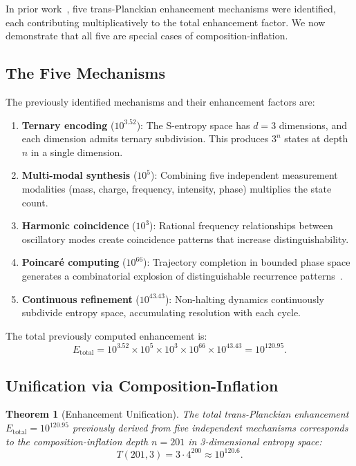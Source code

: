 \documentclass[twocolumn,10pt,a4paper]{article}
\newtheorem{theorem}{Theorem}[section]
\theoremstyle{definition}
\theoremstyle{remark}
\begin{document}
In prior work~\cite{sachikonye2025trans}, five trans-Planckian enhancement mechanisms were identified, each contributing multiplicatively to the total enhancement factor. We now demonstrate that all five are special cases of composition-inflation.

\subsection{The Five Mechanisms}

The previously identified mechanisms and their enhancement factors are:

\begin{enumerate}[label=\textbf{M\arabic*}:]
\item \textbf{Ternary encoding} ($10^{3.52}$): The S-entropy space has $d = 3$ dimensions, and each dimension admits ternary subdivision. This produces $3^n$ states at depth $n$ in a single dimension.
\item \textbf{Multi-modal synthesis} ($10^{5}$): Combining five independent measurement modalities (mass, charge, frequency, intensity, phase) multiplies the state count.
\item \textbf{Harmonic coincidence} ($10^{3}$): Rational frequency relationships between oscillatory modes create coincidence patterns that increase distinguishability.
\item \textbf{Poincar\'{e} computing} ($10^{66}$): Trajectory completion in bounded phase space generates a combinatorial explosion of distinguishable recurrence patterns~\cite{poincare1890}.
\item \textbf{Continuous refinement} ($10^{43.43}$): Non-halting dynamics continuously subdivide entropy space, accumulating resolution with each cycle.
\end{enumerate}

The total previously computed enhancement is:
\begin{equation}
E_{\mathrm{total}} = 10^{3.52} \times 10^{5} \times 10^{3} \times 10^{66} \times 10^{43.43} = 10^{120.95}.
\end{equation}

\subsection{Unification via Composition-Inflation}

\begin{theorem}[Enhancement Unification]
\label{thm:unification}
The total trans-Planckian enhancement $E_{\mathrm{total}} = 10^{120.95}$ previously derived from five independent mechanisms corresponds to the composition-inflation depth $n = 201$ in 3-dimensional entropy space:
\begin{equation}
T(201, 3) = 3 \cdot 4^{200} \approx 10^{120.6}.
\end{equation}
\end{theorem}
\end{document}
